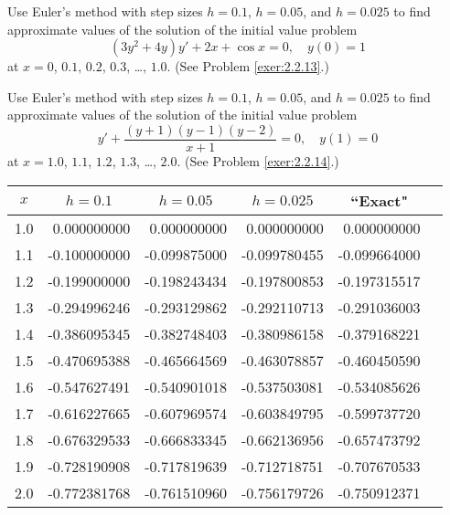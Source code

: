 \documentclass{ximera}
\begin{document}
\begin{problem}\label{exer:3.1.11} 
Use Euler's method with step sizes $h=0.1$, $h=0.05$, and $h=0.025$ to
find approximate values of the solution of the initial value problem
$$
(3y^2+4y)y'+2x+\cos x=0, \quad y(0)=1
$$
at $x=0$, $0.1$, $0.2$, $0.3$, \dots, $1.0$. (See Problem \ref{exer:2.2.13}.)
\end{problem}

\begin{problem}\label{exer:3.1.12} 
Use Euler's method with step sizes $h=0.1$, $h=0.05$, and $h=0.025$ to
find approximate values of the solution of the initial value problem
$$
y'+\frac{(y+1)(y-1)(y-2)}{x+1}=0, \quad y(1)=0
$$
at $x=1.0$, $1.1$, $1.2$, $1.3$, \dots, $2.0$. (See Problem \ref{exer:2.2.14}.)



\begin{solution}
    {\small
\begin{tabular}{|c|r|r|r|r|r|}
\hline
\multicolumn{1}{|c|}{$x$}&
\multicolumn{1}{|c|}{$h=0.1$}&
\multicolumn{1}{|c|}{$h=0.05$}&
\multicolumn{1}{|c|}{$h=0.025$}&
\multicolumn{1}{|c|}{``Exact"}\\ \hline
1.0 &  0.000000000 &  0.000000000 &  0.000000000 &  0.000000000 \\
1.1 & -0.100000000 & -0.099875000 & -0.099780455 & -0.099664000 \\
1.2 & -0.199000000 & -0.198243434 & -0.197800853 & -0.197315517 \\
1.3 & -0.294996246 & -0.293129862 & -0.292110713 & -0.291036003 \\
1.4 & -0.386095345 & -0.382748403 & -0.380986158 & -0.379168221 \\
1.5 & -0.470695388 & -0.465664569 & -0.463078857 & -0.460450590 \\
1.6 & -0.547627491 & -0.540901018 & -0.537503081 & -0.534085626 \\
1.7 & -0.616227665 & -0.607969574 & -0.603849795 & -0.599737720 \\
1.8 & -0.676329533 & -0.666833345 & -0.662136956 & -0.657473792 \\
1.9 & -0.728190908 & -0.717819639 & -0.712718751 & -0.707670533 \\
2.0 & -0.772381768 & -0.761510960 & -0.756179726 & -0.750912371 \\
\hline
\end{tabular}}

\end{solution}
\end{problem}
\end{document}
